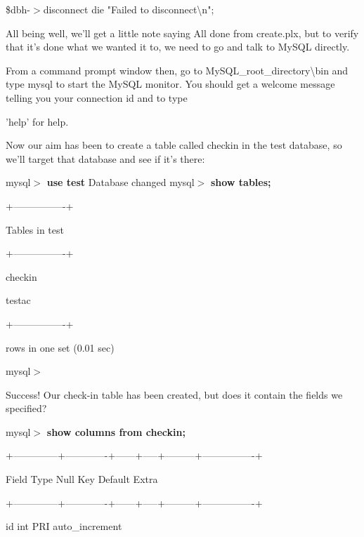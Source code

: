 \documentclass[a4paper,11pt]{book}
\begin{document}
\noindent \$dbh-$>$disconnect \textbar \textbar  die "Failed to disconnect\textbackslash n";

\noindent 

\noindent All being well, we'll get a little note saying All done from create.plx, but to verify that it's done what we wanted it to, we need to go and talk to MySQL directly.

\noindent 

\noindent From a command prompt window then, go to MySQL\_root\_directory\textbackslash bin and type mysql to start the MySQL monitor. You should get a welcome message telling you your connection id and to type

\noindent 'help' for help.

\noindent 

\noindent Now our aim has been to create a table called checkin in the test database, so we'll target that database and see if it's there:

\noindent 

\noindent mysql$>$ \textbf{use test }Database changed mysql$>$ \textbf{show tables;}

\noindent +----------------+

\noindent \textbar  Tables in test \textbar 

\noindent +----------------+

\noindent \textbar  checkin \textbar 

\noindent \textbar  testac \textbar 

\noindent +----------------+

 rows in one set (0.01 sec)

\noindent mysql$>$

\noindent 

\noindent Success! Our check-in table has been created, but does it contain the fields we specified?

\noindent 

\noindent mysql$>$ \textbf{show columns from checkin;}

\noindent +--------------+-------------+------+-----+---------+----------------+

\noindent \textbar  Field \textbar  Type \textbar  Null \textbar  Key \textbar  Default \textbar  Extra \textbar 

\noindent +--------------+-------------+------+-----+---------+----------------+

\noindent \textbar  id \textbar  int \textbar  \textbar  PRI  \textbar  auto\_increment \textbar 
\end{document}
